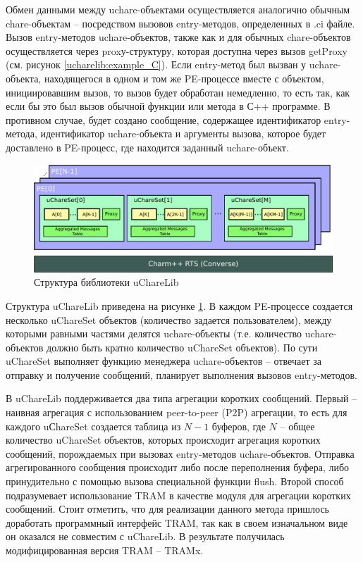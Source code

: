 \documentclass[11pt, oneside, a4paper]{article}
\begin{document}
Обмен данными между uchare-объектами осуществляется аналогично обычным chare-объектам -- посредством вызовов entry-методов, определенных
в .ci файле. Вызов entry-методов uchare-объектов, также как и для обычных chare-объектов осуществляется через proxу-структуру, которая 
доступна через вызов getProxy (см. рисунок \ref{ucharelib:example_C}). 
Если entry-метод был вызван у uchare-объекта, находящегося в одном и том же PE-процессе вместе с объектом, инициировавшим
вызов, то вызов будет обработан немедленно, то есть так, как если бы это был вызов обычной функции или метода в С++ программе. В противном случае,
будет создано сообщение, содержащее идентификатор entry-метода, идентификатор uchare-объекта и аргументы вызова, которое будет доставлено в
PE-процесс, где находится заданный uchare-объект.

\begin{figure}[!t]
\centering
%
\includegraphics[width=0.7\linewidth]{img/ucharelib_overview.pdf}
\caption{Структура библиотеки uChareLib}
\label{ucharelib:overview} 
\end{figure}

Структура uChareLib приведена на рисунке \ref{ucharelib:overview}. В каждом PE-процессе создается несколько uChareSet объектов
(количество задается пользователем), между которыми равными частями делятся uchare-объекты (т.е. количество uchare-объектов должно
быть кратно количество uChareSet объектов). По сути uChareSet выполняет функцию менеджера uchare-объектов -- отвечает за отправку и
получение сообщений, планирует выполнения вызовов entry-методов.  

В uChareLib поддерживается два типа агрегации коротких сообщений. Первый -- наивная агрегация с использованием peer-to-peer (P2P)
агрегации, то есть для каждого uСhareSet создается таблица из $N-1$ буферов, где $N$ -- общее количество uChareSet объектов,
 которых происходит агрегация коротких сообщений, порождаемых при вызовах entry-методов uchare-объектов. Отправка агрегированного
сообщения происходит либо после переполнения буфера, либо принудительно с помощью вызова специальной функции flush. Второй способ 
подразумевает использование TRAM в качестве модуля для агрегации коротких сообщений. Стоит отметить, что для реализации данного
метода пришлось доработать программный интерфейс TRAM, так как в своем изначальном виде он оказался не совместим с uChareLib.
В результате получилась модифицированная версия TRAM -- TRAMx.
\end{document}
